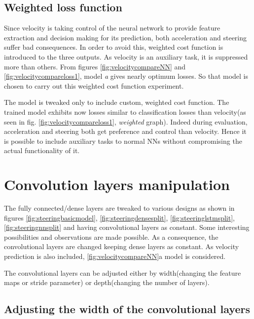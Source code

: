 \subsection{Weighted loss function}
Since velocity is taking control of the neural network to provide feature extraction and
decision making for its prediction, both acceleration and steering suffer bad
consequences. In order to avoid this, weighted cost function is introduced to the three
outputs. As velocity is an auxiliary task, it is suppressed more than others. From figures
\ref{fig:velocitycompareNN} and \ref{fig:velocitycompareloss1}, model \textit{a} gives
nearly optimum losses. So that model is chosen to carry out this weighted cost function
experiment.

The model is tweaked only to include custom, weighted cost function. The trained model
exhibits now losses similar to classification losses than velocity(as seen in fig. \ref{fig:velocitycompareloss1}, \textit{weighted} graph). Indeed during
evaluation, acceleration and steering both get preference and control than velocity.
Hence it is possible to include auxiliary tasks to normal NNs without compromising the
actual functionality of it.

\section{Convolution layers manipulation}
The fully connected/dense layers are tweaked to various designs as shown in
figures \ref{fig:steeringbasicmodel}, \ref{fig:steeringdensesplit},
\ref{fig:steeringlstmsplit}, \ref{fig:steeringnnsplit} and having convolutional layers as
constant. Some interesting possibilities and observations are made possible. As a
consequence, the convolutional layers are changed keeping dense layers as constant.
As velocity prediction is also included, \ref{fig:velocitycompareNN}{a} model is
considered.

The convolutional layers can be adjusted either by width(changing the feature maps or
stride parameter) or depth(changing the number of layers).
\subsection{Adjusting the width of the convolutional layers}
